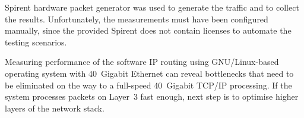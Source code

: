 Spirent hardware packet generator was used to generate the traffic and to collect the results.
Unfortunately, the measurements must have been configured manually, since the provided Spirent does not
contain licenses to automate the testing scenarios.

Measuring performance of the software IP routing using GNU/Linux-based operating system with 40~Gigabit Ethernet
can reveal bottlenecks that need to be eliminated
on the way to a full-speed 40~Gigabit TCP/IP processing.
If the system processes packets on Layer~3 fast enough,
next step is to optimise higher layers of the network stack.
